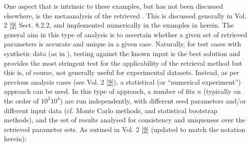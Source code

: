 \documentclass[letterpaper,table,10pt,english]{jupyterBook}
\begin{document}
\sphinxAtStartPar
One aspect that is intrinsic to these examples, but has not been discussed elsewhere, is the meta\sphinxhyphen{}analysis of the retrieved {\hyperref[\detokenize{backmatter/glossary:term-radial-matrix-elements}]{}}. This is discussed generally in  Vol. 2 {[}\hyperlink{cite.backmatter/bibliography:id678}{9}{]} Sect. 8.2.2, and implemented numerically in the examples in {\hyperref[\detokenize{part2/extracting_matrix_elements_overview_270423:chpt-extracting-matrix-elements-overview}]{}} herein. The general aim in this type of analysis is to ascertain whether a given set of retrieved parameters is accurate and unique in a given case. Naturally, for test cases with synthetic data (as in {\hyperref[\detokenize{part2/extracting_matrix_elements_overview_270423:chpt-extracting-matrix-elements-overview}]{}}), testing against the known input {\hyperref[\detokenize{backmatter/glossary:term-radial-matrix-elements}]{}} is the best solution and provides the most stringent test for the applicability of the retrieval method \sphinxhyphen{} but this is, of course, not generally useful for experimental datasets. Instead, as per previous analysis cases (see  Vol. 2 {[}\hyperlink{cite.backmatter/bibliography:id678}{9}{]}), a statistical (or “numerical experiment”) approach can be used. In this type of approach, a number of fits \(n\) (typically on the order of \(10^2\)\sphinxhyphen{}\(10^4\)) are run independently, with different seed parameters and/or different input data (cf. Monte Carlo methods, and statistical bootstrap methods), and the set of results analysed for consistency and uniqueness over the retrieved parameter sets. As outined in  Vol. 2 {[}\hyperlink{cite.backmatter/bibliography:id678}{9}{]} (updated to match the notation herein):
\end{document}
